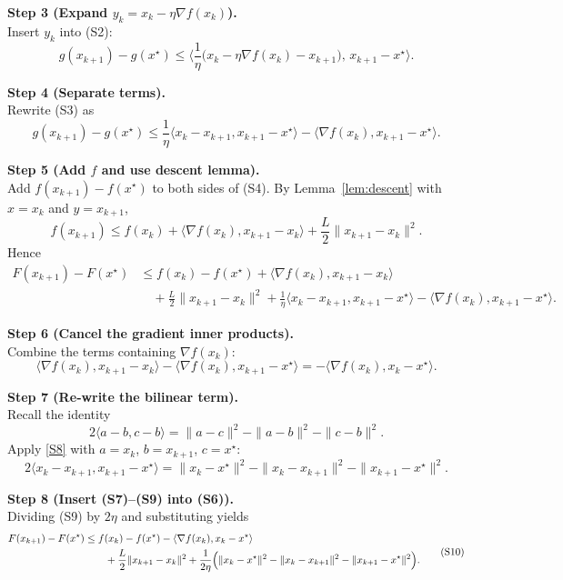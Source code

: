 \documentclass{article}
\begin{document}
\begin{enumerate}
\noindent\textbf{Step 3 (Expand $y_{k}=x_{k}-\eta\nabla f(x_{k})$).}\\
Insert $y_{k}$ into (S2):
\[
g(x_{k+1})-g(x^{\star})\le
\Big\langle\frac{1}{\eta}\bigl(x_{k}-\eta\nabla f(x_{k})-x_{k+1}\bigr),\,x_{k+1}-x^{\star}\Big\rangle .
\tag{S3}
\]

\noindent\textbf{Step 4 (Separate terms).}\\
Rewrite (S3) as
\[
g(x_{k+1})-g(x^{\star})\le
\frac{1}{\eta}\langle x_{k}-x_{k+1},x_{k+1}-x^{\star}\rangle
-\langle\nabla f(x_{k}),x_{k+1}-x^{\star}\rangle .
\tag{S4}
\]

\noindent\textbf{Step 5 (Add $f$ and use descent lemma).}\\
Add $f(x_{k+1})-f(x^{\star})$ to both sides of (S4). By Lemma~\ref{lem:descent} with $x=x_{k}$ and $y=x_{k+1}$,
\[
f(x_{k+1})\le f(x_{k})+\langle\nabla f(x_{k}),x_{k+1}-x_{k}\rangle+\frac{L}{2}\|x_{k+1}-x_{k}\|^{2}.
\tag{S5}
\]
Hence
\[
\begin{aligned}
F(x_{k+1})-F(x^{\star})
&\le f(x_{k})-f(x^{\star})
+\langle\nabla f(x_{k}),x_{k+1}-x_{k}\rangle\\
&\quad+\frac{L}{2}\|x_{k+1}-x_{k}\|^{2}
+\frac{1}{\eta}\langle x_{k}-x_{k+1},x_{k+1}-x^{\star}\rangle
-\langle\nabla f(x_{k}),x_{k+1}-x^{\star}\rangle .
\end{aligned}
\tag{S6}
\]

\noindent\textbf{Step 6 (Cancel the gradient inner products).}\\
Combine the terms containing $\nabla f(x_{k})$:
\[
\langle\nabla f(x_{k}),x_{k+1}-x_{k}\rangle-\langle\nabla f(x_{k}),x_{k+1}-x^{\star}\rangle
=-\langle\nabla f(x_{k}),x_{k}-x^{\star}\rangle .
\tag{S7}
\]

\noindent\textbf{Step 7 (Re‑write the bilinear term).}\\
Recall the identity
\[
2\langle a-b,c-b\rangle = \|a-c\|^{2}-\|a-b\|^{2}-\|c-b\|^{2}.
\tag{S8}
\]
Apply \eqref{S8} with $a=x_{k}$, $b=x_{k+1}$, $c=x^{\star}$:
\[
2\langle x_{k}-x_{k+1},x_{k+1}-x^{\star}\rangle
= \|x_{k}-x^{\star}\|^{2}-\|x_{k}-x_{k+1}\|^{2}-\|x_{k+1}-x^{\star}\|^{2}.
\tag{S9}
\]

\noindent\textbf{Step 8 (Insert (S7)–(S9) into (S6)).}\\
Dividing (S9) by $2\eta$ and substituting yields
\[
\begin{aligned}
F(x_{k+1})-F(x^{\star})
&\le f(x_{k})-f(x^{\star})-\langle\nabla f(x_{k}),x_{k}-x^{\star}\rangle\\
&\qquad+\frac{L}{2}\|x_{k+1}-x_{k}\|^{2}
+\frac{1}{2\eta}\Bigl(\|x_{k}-x^{\star}\|^{2}-\|x_{k}-x_{k+1}\|^{2}-\|x_{k+1}-x^{\star}\|^{2}\Bigr).
\end{aligned}
\tag{S10}
\]


\end{enumerate}
\end{document}
